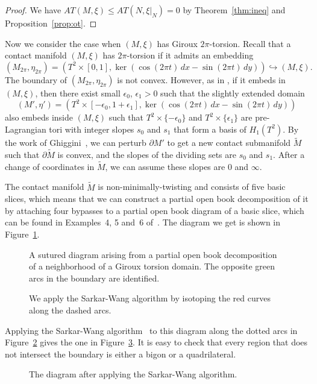 \documentclass[11pt,oneside,english]{amsart}
\numberwithin{equation}{section}
\numberwithin{figure}{section}
\theoremstyle{definition}
\theoremstyle{plain}
\theoremstyle{plain}
\theoremstyle{remark}
\theoremstyle{plain}
\begin{document}
\begin{proof}
We have $AT(M,\xi)\le AT(N,\xi|_{N})=0$ by Theorem~\ref{thm:ineq} and Proposition~\ref{prop:ot}.
\end{proof}

Now we consider the case when $(M,\xi)$ has Giroux $2\pi$-torsion.
Recall that a contact manifold $(M,\xi)$ has $2\pi$-torsion if it
admits an embedding
\[
(M_{2\pi},\eta_{2\pi})=(T^{2}\times[0,1],\ker(\cos(2\pi t)\,dx-\sin(2\pi t)\,dy))\hookrightarrow(M,\xi).
\]
The boundary of $(M_{2\pi},\eta_{2\pi})$ is not convex. However, as in \cite[Lemma~5]{key-5},
if it embeds in $(M,\xi)$, then there exist small $\epsilon_0$, $\epsilon_1 >0$
such that the slightly extended domain
\[
(M',\eta')= \left(T^{2}\times[-\epsilon_0,1+\epsilon_1],\ker(\cos(2\pi t)\,dx-\sin(2\pi t)\,dy) \right)
\]
also embeds inside $(M,\xi)$ such that $T^2 \times \{-\epsilon_0\}$ and $T^2 \times \{\epsilon_1\}$
are pre-Lagrangian tori with integer slopes $s_0$ and $s_1$ that form a basis of $H_1(T^2)$.
By the work of Ghiggini~\cite{key-3}, we can perturb $\partial M'$
to get a new contact submanifold $\widetilde{M}$
such that $\partial\widetilde{M}$ is convex, and the slopes of the
dividing sets are $s_0$ and $s_1$. After a change of coordinates in $\widetilde{M}$,
we can assume these slopes are $0$ and $\infty$.

The contact manifold $\widetilde{M}$ is non-minimally-twisting and consists of five basic slices,
which means that we can construct a partial open book decomposition
of it by attaching four bypasses to a partial open book diagram of
a basic slice, which can be found in Examples~4, 5 and~6 of~\cite{key-1}.
The diagram we get is shown in Figure~\ref{fig:gt}.
\begin{figure}
\caption{A sutured diagram arising from a partial open book decomposition of a neighborhood of a Giroux torsion domain.
The opposite green arcs in the boundary are identified.}
\label{fig:gt}
\end{figure}

\begin{figure}
\caption{We apply the Sarkar-Wang algorithm by isotoping the red curves along the dashed arcs.}
\label{fig:dashed}
\end{figure}

Applying the Sarkar-Wang algorithm~\cite{key-12} to this diagram along the dotted arcs in Figure~\ref{fig:dashed}
gives the one in Figure~\ref{fig:SW}. It is easy to check that every
region that does not intersect the boundary is either a bigon or a quadrilateral.
\begin{figure}
\caption{The diagram after applying the Sarkar-Wang algorithm.}
\label{fig:SW}
\end{figure}
\end{document}
